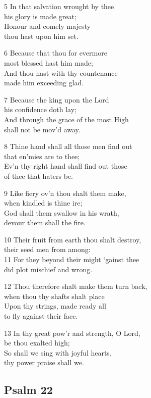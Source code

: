 \begin{multicols}{3}
5 In that salvation wrought by thee\\
his glory is made great;\\
Honour and comely majesty\\
thou hast upon him set.

6 Because that thou for evermore\\
most blessed hast him made;\\
And thou hast with thy countenance\\
made him exceeding glad.

7 Because the king upon the Lord\\
his confidence doth lay;\\
And through the grace of the most High\\
shall not be mov’d away.

8 Thine hand shall all those men find out\\
that en’mies are to thee;\\
Ev’n thy right hand shall find out those\\
of thee that haters be.

9 Like fiery ov’n thou shalt them make,\\
when kindled is thine ire;\\
God shall them swallow in his wrath,\\
devour them shall the fire.

10 Their fruit from earth thou shalt destroy,\\
their seed men from among:\\
11 For they beyond their might ‘gainst thee\\
did plot mischief and wrong.

12 Thou therefore shalt make them turn back,\\
when thou thy shafts shalt place\\
Upon thy strings, made ready all\\
to fly against their face.

13 In thy great pow’r and strength, O Lord,\\
be thou exalted high;\\
So shall we sing with joyful hearts,\\
thy power praise shall we.

\begin{center}
\quad{}\quad{}
\end{center}

\subsection*{Psalm 22 }


\end{multicols}
